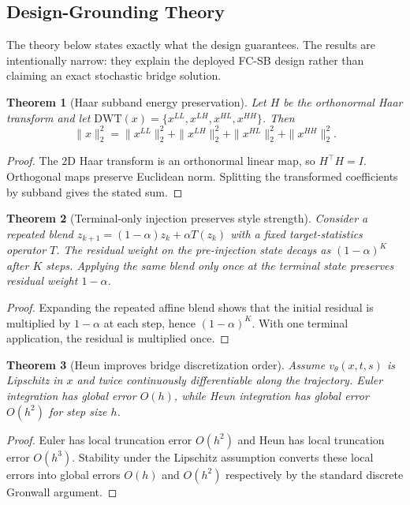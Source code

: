 \documentclass[letterpaper]{article}
\newtheorem{theorem}{Theorem}
\begin{document}
\subsection{Design-Grounding Theory}
The theory below states exactly what the design guarantees. The results are intentionally narrow: they explain the deployed FC-SB design rather than claiming an exact stochastic bridge solution.

\begin{theorem}[Haar subband energy preservation]
Let $H$ be the orthonormal Haar transform and let $\mathrm{DWT}(x)=\{x^{LL},x^{LH},x^{HL},x^{HH}\}$. Then
\begin{equation}
    \|x\|_2^2 =
    \|x^{LL}\|_2^2+\|x^{LH}\|_2^2+\|x^{HL}\|_2^2+\|x^{HH}\|_2^2 .
\end{equation}
\end{theorem}
\begin{proof}
The 2D Haar transform is an orthonormal linear map, so $H^\top H=I$. Orthogonal maps preserve Euclidean norm. Splitting the transformed coefficients by subband gives the stated sum.
\end{proof}

\begin{theorem}[Terminal-only injection preserves style strength]
Consider a repeated blend $z_{k+1}=(1-\alpha)z_k+\alpha T(z_k)$ with a fixed target-statistics operator $T$. The residual weight on the pre-injection state decays as $(1-\alpha)^K$ after $K$ steps. Applying the same blend only once at the terminal state preserves residual weight $1-\alpha$.
\end{theorem}
\begin{proof}
Expanding the repeated affine blend shows that the initial residual is multiplied by $1-\alpha$ at each step, hence $(1-\alpha)^K$. With one terminal application, the residual is multiplied once.
\end{proof}

\begin{theorem}[Heun improves bridge discretization order]
Assume $v_\theta(x,t,s)$ is Lipschitz in $x$ and twice continuously differentiable along the trajectory. Euler integration has global error $O(h)$, while Heun integration has global error $O(h^2)$ for step size $h$.
\end{theorem}
\begin{proof}
Euler has local truncation error $O(h^2)$ and Heun has local truncation error $O(h^3)$. Stability under the Lipschitz assumption converts these local errors into global errors $O(h)$ and $O(h^2)$ respectively by the standard discrete Gronwall argument.
\end{proof}
\end{document}
